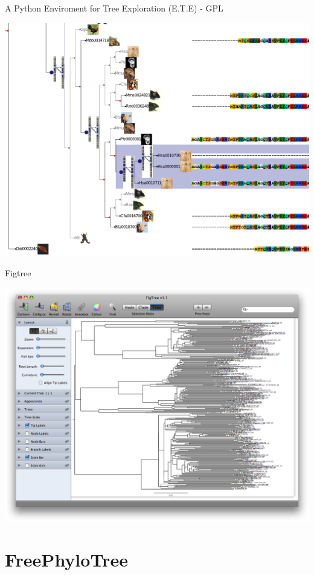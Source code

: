 \documentclass[green, compress]{beamer}
\begin{document}
\begin{frame}{A Python Enviroment for Tree Exploration (E.T.E) - GPL}
\begin{center}
\includegraphics[scale=.5]{ETE.png}
\end{center}
\end{frame}

\begin{frame}{Figtree}
\begin{center}
\includegraphics[scale=.2]{figtree.png}
\end{center}
\end{frame}

\section{FreePhyloTree}
\end{document}

